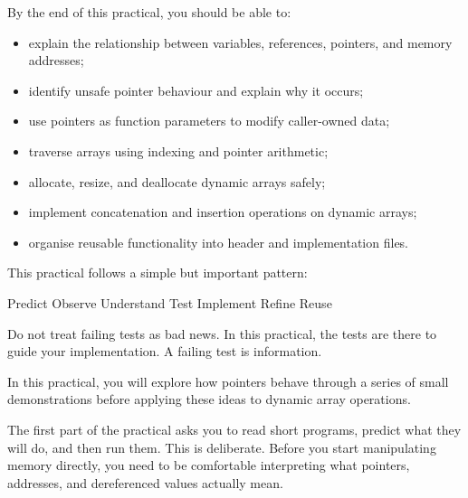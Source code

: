 \documentclass{csc2059practical}
\begin{document}
\maketitle
\tableofcontents
\clearpage

\begin{learningoutcomes}
By the end of this practical, you should be able to:
\begin{itemize}
  \item explain the relationship between variables, references, pointers, and memory addresses;
  \item identify unsafe pointer behaviour and explain why it occurs;
  \item use pointers as function parameters to modify caller-owned data;
  \item traverse arrays using indexing and pointer arithmetic;
  \item allocate, resize, and deallocate dynamic arrays safely;
  \item implement concatenation and insertion operations on dynamic arrays;
  \item organise reusable functionality into header and implementation files.
\end{itemize}
\end{learningoutcomes}

\begin{workflowreminder}
This practical follows a simple but important pattern:

\begin{center}
  
\VerticalWorkflowSeven
      {Predict}
      {Observe}
      {Understand}
      {Test}
      {Implement}
      {Refine}
      {Reuse}

\end{center}

Do not treat failing tests as bad news. In this practical, the tests are there to guide your implementation. A failing test is information.
\end{workflowreminder}


In this practical, you will explore how pointers behave through a series of small demonstrations before applying these ideas to dynamic array operations.

The first part of the practical asks you to read short programs, predict what they will do, and then run them. This is deliberate. Before you start manipulating memory directly, you need to be comfortable interpreting what pointers, addresses, and dereferenced values actually mean.
\end{document}
